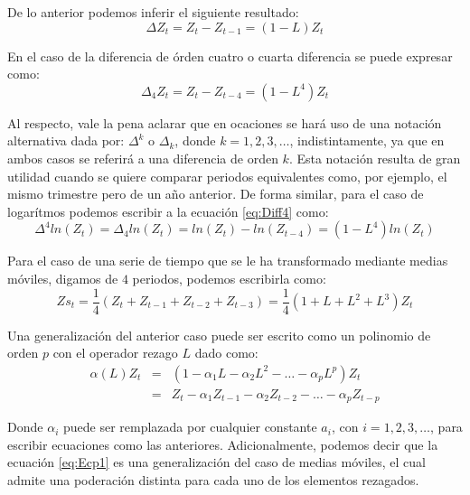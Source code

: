 \documentclass[
]{book}
\begin{document}
De lo anterior podemos inferir el siguiente resultado:
\begin{equation}
    \Delta Z_{t} = Z_{t} - Z_{t-1} = (1 - L) Z_{t} 
    \label{eq:Lag5}
\end{equation}

En el caso de la diferencia de órden cuatro o cuarta diferencia se puede expresar como:
\begin{equation}
    \Delta_{4} Z_{t} = Z_{t} - Z_{t-4} = (1 - L^4) Z_{t}
\label{eq:Diff4}
\end{equation}

Al respecto, vale la pena aclarar que en ocaciones se hará uso de una notación alternativa dada por: \(\Delta^k\) o \(\Delta_k\), donde \(k = 1, 2, 3, \ldots\), indistintamente, ya que en ambos casos se referirá a una diferencia de orden \(k\). Esta notación resulta de gran utilidad cuando se quiere comparar periodos equivalentes como, por ejemplo, el mismo trimestre pero de un año anterior. De forma similar, para el caso de logarítmos podemos escribir a la ecuación \eqref{eq:Diff4} como:
\begin{equation}
    \Delta^{4} ln(Z_{t}) = \Delta_{4} ln(Z_{t}) = ln(Z_{t}) - ln(Z_{t-4}) = (1 - L^4) ln(Z_{t}) 
    \label{eq:Diff5}
\end{equation}

Para el caso de una serie de tiempo que se le ha transformado mediante medias móviles, digamos de \(4\) periodos, podemos escribirla como:
\begin{equation}
    Zs_{t} = \frac{1}{4}(Z_{t} + Z_{t-1} + Z_{t-2} + Z_{t-3}) = \frac{1}{4}(1 + L + L^2 + L^3)Z_{t}
    \label{eq:Diff6}
\end{equation}

Una generalización del anterior caso puede ser escrito como un polinomio de orden \(p\) con el operador rezago \(L\) dado como:
\begin{eqnarray}
    \alpha(L) Z_{t} & = & (1 - \alpha_1 L - \alpha_2 L^2 - \ldots - \alpha_p L^p) Z_{t} \nonumber \\
    & = & Z_{t} - \alpha_1 Z_{t-1} - \alpha_2 Z_{t-2} - \ldots - \alpha_p Z_{t-p}
\label{eq:Ecp1}
\end{eqnarray}

Donde \(\alpha_i\) puede ser remplazada por cualquier constante \(a_i\), con \(i = 1, 2, 3, \ldots\), para escribir ecuaciones como las anteriores. Adicionalmente, podemos decir que la ecuación \eqref{eq:Ecp1} es una generalización del caso de medias móviles, el cual admite una poderación distinta para cada uno de los elementos rezagados.
\end{document}
